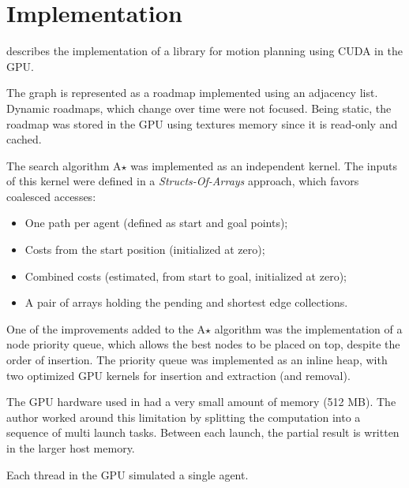 \section{Implementation}

\cite{bleiweiss08} describes the implementation of a library for motion planning using CUDA in the GPU.

The graph is represented as a roadmap implemented using an adjacency list. Dynamic roadmaps, which change over time were not focused. Being static, the roadmap was stored in the GPU using textures memory since it is read-only and cached.

The search algorithm A$\star$ was implemented as an independent kernel. The inputs of this kernel were defined in a \textit{Structs-Of-Arrays} approach, which favors coalesced accesses:
\begin{itemize}
	\item One path per agent (defined as start and goal points);
	\item Costs from the start position (initialized at zero);
	\item Combined costs (estimated, from start to goal, initialized at zero);
	\item A pair of arrays holding the pending and shortest edge collections.
\end{itemize}

One of the improvements added to the A$\star$ algorithm was the implementation of a node priority queue, which allows the best nodes to be placed on top, despite the order of insertion.
The priority queue was implemented as an inline heap, with two optimized GPU kernels for insertion and extraction (and removal).

The GPU hardware used in \cite{bleiweiss08} had a very small amount of memory (512 MB). The author worked around this limitation by splitting the computation into a sequence of multi launch tasks. Between each launch, the partial result is written in the larger host memory.

Each thread in the GPU simulated a single agent.